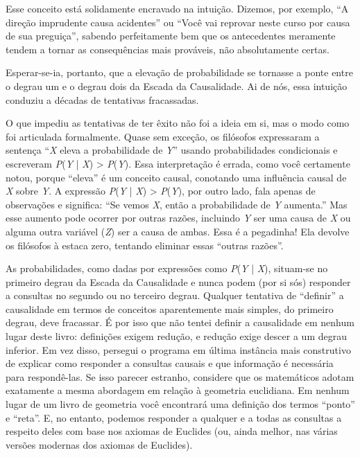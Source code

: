 \documentclass[11pt,a5paper,twoside]{book}
\begin{document}
Esse conceito está solidamente encravado na intuição. Dizemos, por exemplo, “A direção imprudente causa acidentes” ou “Você vai reprovar neste curso por causa de sua preguiça”, sabendo perfeitamente bem que os antecedentes meramente tendem a tornar as consequências mais prováveis, não absolutamente certas.

Esperar-se-ia, portanto, que a elevação de probabilidade se tornasse a ponte entre o degrau um e o degrau dois da Escada da Causalidade. Ai de nós, essa intuição conduziu a décadas de tentativas fracassadas.

O que impediu as tentativas de ter êxito não foi a ideia em si, mas o modo como foi articulada formalmente. Quase sem exceção, os filósofos expressaram a sentença “\textit{X} eleva a probabilidade de \textit{Y}” usando probabilidades condicionais e escreveram \textit{P}(\textit{Y} | \textit{X}) > \textit{P}(\textit{Y}). Essa interpretação é errada, como você certamente notou, porque “eleva” é um conceito causal, conotando uma influência causal de \textit{X} sobre \textit{Y}. A expressão \textit{P}(\textit{Y} | \textit{X}) > \textit{P}(\textit{Y}), por outro lado, fala apenas de observações e significa: “Se vemos \textit{X}, então a probabilidade de \textit{Y} aumenta.” Mas esse aumento pode ocorrer por outras razões, incluindo \textit{Y} ser uma causa de \textit{X} ou alguma outra variável (\textit{Z}) ser a causa de ambas. Essa é a pegadinha! Ela devolve os filósofos à estaca zero, tentando eliminar essas “outras razões”.

As probabilidades, como dadas por expressões como \textit{P}(\textit{Y} | \textit{X}), situam-se no primeiro degrau da Escada da Causalidade e nunca podem (por si sós) responder a consultas no segundo ou no terceiro degrau. Qualquer tentativa de “definir” a causalidade em termos de conceitos aparentemente mais simples, do primeiro degrau, deve fracassar. É por isso que não tentei definir a causalidade em nenhum lugar deste livro: definições exigem redução, e redução exige descer a um degrau inferior. Em vez disso, persegui o programa em última instância mais construtivo de explicar como responder a consultas causais e que informação é necessária para respondê-las. Se isso parecer estranho, considere que os matemáticos adotam exatamente a mesma abordagem em relação à geometria euclidiana. Em nenhum lugar de um livro de geometria você encontrará uma definição dos termos “ponto” e “reta”. E, no entanto, podemos responder a qualquer e a todas as consultas a respeito deles com base nos axiomas de Euclides (ou, ainda melhor, nas várias versões modernas dos axiomas de Euclides).
\end{document}

